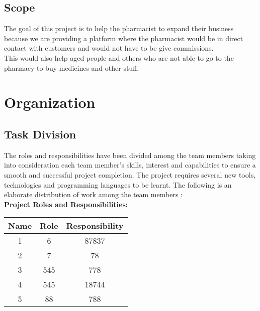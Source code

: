 \documentclass[
10pt, %
a4paper, %
oneside, %
headinclude,footinclude, %
BCOR5mm, %
]{scrartcl}
\begin{document}

\subsection{Scope}
The goal of this project is to help the pharmacist to expand their business because we are providing a platform where the pharmacist would be in direct contact with customers and would not have to be give commissions.\\
This would also help aged people and others who are not able to go to the pharmacy to buy medicines and other stuff.

\section{ Organization}
\subsection{Task Division}


The roles and responsibilities have been divided among the team members taking into consideration each team member’s skills, interest and capabilities to ensure a smooth and successful project completion. The project requires several new tools, technologies and programming languages to be learnt. The following is an elaborate distribution of work among the team members :
\vspace{2cm}
\\\textbf{Project Roles and Responsibilities:}
\begin{center}
 \begin{tabular}{||c| c| c||} 
 \hline
 Name & Role & Responsibility  \\ [1.5ex] 
 \hline\hline
 1 & 6 & 87837   \\ 
 \hline
 2 & 7 & 78  \\
 \hline
 3 & 545 & 778 \\
 \hline
 4 & 545 & 18744 \\
 \hline
 5 & 88 & 788 \\ [1ex] 
 \hline
\end{tabular}
\end{center}
\end{document}
